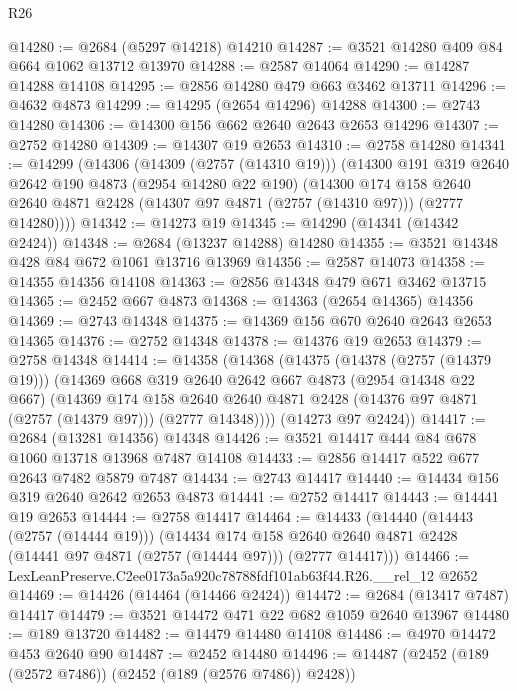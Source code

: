 \begin{lexlean}{R26}
\begin{coremodule}
@14280 := @2684 (@5297 @14218) @14210
@14287 := @3521 @14280 @409 @84 @664 @1062 @13712 @13970
@14288 := @2587 @14064
@14290 := @14287 @14288 @14108
@14295 := @2856 @14280 @479 @663 @3462 @13711
@14296 := @4632 @4873
@14299 := @14295 (@2654 @14296) @14288
@14300 := @2743 @14280
@14306 := @14300 @156 @662 @2640 @2643 @2653 @14296
@14307 := @2752 @14280
@14309 := @14307 @19 @2653
@14310 := @2758 @14280
@14341 := @14299
    (@14306
      (@14309 (@2757 (@14310 @19)))
      (@14300
        @191
        @319
        @2640
        @2642
        @190
        @4873
        (@2954 @14280 @22 @190)
        (@14300
          @174
          @158
          @2640
          @2640
          @4871
          @2428
          (@14307 @97 @4871 (@2757 (@14310 @97)))
          (@2777 @14280))))
@14342 := @14273 @19
@14345 := @14290 (@14341 (@14342 @2424))
@14348 := @2684 (@13237 @14288) @14280
@14355 := @3521 @14348 @428 @84 @672 @1061 @13716 @13969
@14356 := @2587 @14073
@14358 := @14355 @14356 @14108
@14363 := @2856 @14348 @479 @671 @3462 @13715
@14365 := @2452 @667 @4873
@14368 := @14363 (@2654 @14365) @14356
@14369 := @2743 @14348
@14375 := @14369 @156 @670 @2640 @2643 @2653 @14365
@14376 := @2752 @14348
@14378 := @14376 @19 @2653
@14379 := @2758 @14348
@14414 := @14358
    (@14368
      (@14375
        (@14378 (@2757 (@14379 @19)))
        (@14369
          @668
          @319
          @2640
          @2642
          @667
          @4873
          (@2954 @14348 @22 @667)
          (@14369
            @174
            @158
            @2640
            @2640
            @4871
            @2428
            (@14376 @97 @4871 (@2757 (@14379 @97)))
            (@2777 @14348))))
      (@14273 @97 @2424))
@14417 := @2684 (@13281 @14356) @14348
@14426 := @3521 @14417 @444 @84 @678 @1060 @13718 @13968 @7487 @14108
@14433 := @2856 @14417 @522 @677 @2643 @7482 @5879 @7487
@14434 := @2743 @14417
@14440 := @14434 @156 @319 @2640 @2642 @2653 @4873
@14441 := @2752 @14417
@14443 := @14441 @19 @2653
@14444 := @2758 @14417
@14464 := @14433
    (@14440
      (@14443 (@2757 (@14444 @19)))
      (@14434
        @174
        @158
        @2640
        @2640
        @4871
        @2428
        (@14441 @97 @4871 (@2757 (@14444 @97)))
        (@2777 @14417)))
@14466 := LexLeanPreserve.C2ee0173a5a920c78788fdf101ab63f44.R26.__rel_12 @2652
@14469 := @14426 (@14464 (@14466 @2424))
@14472 := @2684 (@13417 @7487) @14417
@14479 := @3521 @14472 @471 @22 @682 @1059 @2640 @13967
@14480 := @189 @13720
@14482 := @14479 @14480 @14108
@14486 := @4970 @14472 @453 @2640 @90
@14487 := @2452 @14480
@14496 := @14487 (@2452 (@189 (@2572 @7486)) (@2452 (@189 (@2576 @7486)) @2428))

\end{coremodule}
\end{lexlean}
